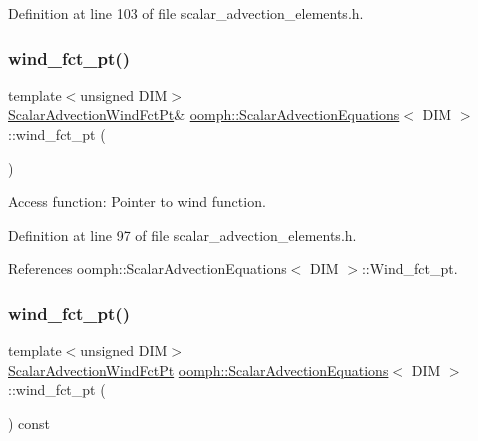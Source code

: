 Definition at line 103 of file scalar\+\_\+advection\+\_\+elements.\+h.

\mbox{\label{classoomph_1_1ScalarAdvectionEquations_aa6de3201b870ea35bf2af0449c10014e}} 
\subsubsection{\texorpdfstring{wind\+\_\+fct\+\_\+pt()}{wind\_fct\_pt()}\hspace{0.1cm}{\footnotesize\ttfamily [1/2]}}
{\footnotesize\ttfamily template$<$unsigned D\+IM$>$ \\
\hyperlink{classoomph_1_1ScalarAdvectionEquations_af80d315e76fe7392744d5442f1d2386d}{Scalar\+Advection\+Wind\+Fct\+Pt}\& \hyperlink{classoomph_1_1ScalarAdvectionEquations}{oomph\+::\+Scalar\+Advection\+Equations}$<$ D\+IM $>$\+::wind\+\_\+fct\+\_\+pt (\begin{DoxyParamCaption}{ }\end{DoxyParamCaption})\hspace{0.3cm}{\ttfamily [inline]}}



Access function\+: Pointer to wind function. 



Definition at line 97 of file scalar\+\_\+advection\+\_\+elements.\+h.



References oomph\+::\+Scalar\+Advection\+Equations$<$ D\+I\+M $>$\+::\+Wind\+\_\+fct\+\_\+pt.

\mbox{\label{classoomph_1_1ScalarAdvectionEquations_a8630d7c8b9771f291701547b3dd10f3c}} 
\subsubsection{\texorpdfstring{wind\+\_\+fct\+\_\+pt()}{wind\_fct\_pt()}\hspace{0.1cm}{\footnotesize\ttfamily [2/2]}}
{\footnotesize\ttfamily template$<$unsigned D\+IM$>$ \\
\hyperlink{classoomph_1_1ScalarAdvectionEquations_af80d315e76fe7392744d5442f1d2386d}{Scalar\+Advection\+Wind\+Fct\+Pt} \hyperlink{classoomph_1_1ScalarAdvectionEquations}{oomph\+::\+Scalar\+Advection\+Equations}$<$ D\+IM $>$\+::wind\+\_\+fct\+\_\+pt (\begin{DoxyParamCaption}{ }\end{DoxyParamCaption}) const\hspace{0.3cm}{\ttfamily [inline]}}



